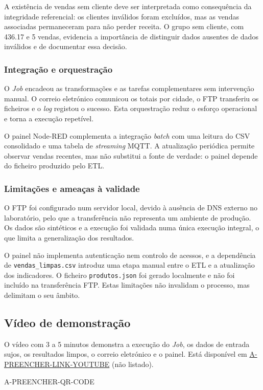 \documentclass[11pt,a4paper]{article}
\begin{document}
A existência de vendas sem cliente deve ser interpretada como consequência da integridade referencial: os clientes inválidos foram excluídos, mas as vendas associadas permaneceram para não perder receita. O grupo sem cliente, com 436.17 e 5 vendas, evidencia a importância de distinguir dados ausentes de dados inválidos e de documentar essa decisão.

\subsubsection{Integração e orquestração}
O \textit{Job} encadeou as transformações e as tarefas complementares sem intervenção manual. O correio eletrónico comunicou os totais por cidade, o FTP transferiu os ficheiros e o \textit{log} registou o sucesso. Esta orquestração reduz o esforço operacional e torna a execução repetível.

O painel Node-RED complementa a integração \textit{batch} com uma leitura do CSV consolidado e uma tabela de \textit{streaming} MQTT. A atualização periódica permite observar vendas recentes, mas não substitui a fonte de verdade: o painel depende do ficheiro produzido pelo ETL.

\subsubsection{Limitações e ameaças à validade}
O FTP foi configurado num servidor local, devido à ausência de DNS externo no laboratório, pelo que a transferência não representa um ambiente de produção. Os dados são sintéticos e a execução foi validada numa única execução integral, o que limita a generalização dos resultados.

O painel não implementa autenticação nem controlo de acessos, e a dependência de \texttt{vendas\_limpas.csv} introduz uma etapa manual entre o ETL e a atualização dos indicadores. O ficheiro \texttt{produtos.json} foi gerado localmente e não foi incluído na transferência FTP. Estas limitações não invalidam o processo, mas delimitam o seu âmbito.

\subsection{Vídeo de demonstração}
O vídeo com 3 a 5 minutos demonstra a execução do \textit{Job}, os dados de entrada sujos, os resultados limpos, o correio eletrónico e o painel. Está disponível em \url{A-PREENCHER-LINK-YOUTUBE} (não listado).
\begin{center}
A-PREENCHER-QR-CODE
\end{center}
\end{document}
